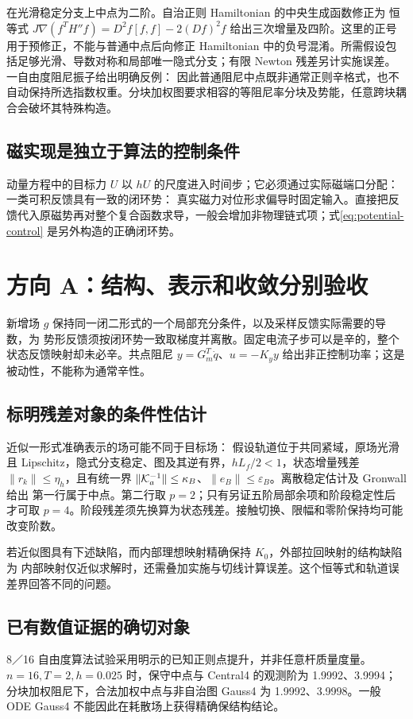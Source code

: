 在光滑稳定分支上中点为二阶。自治正则 Hamiltonian 的中央生成函数修正为
\EqCentral
恒等式 $J\nabla(f^TH''f)=D^2f[f,f]-2(Df)^2f$ 给出三次增量及四阶。这里的正号用于预修正，不能与普通中点后向修正 Hamiltonian 中的负号混淆。所需假设包括足够光滑、导数对称和局部唯一隐式分支；有限 Newton 残差另计实施误差。一自由度阻尼振子给出明确反例：
\EqDampingCounterexample
因此普通阻尼中点既非通常正则辛格式，也不自动保持所选指数权重。分块加权图要求相容的等阻尼率分块及势能，任意跨块耦合会破坏其特殊构造。

\subsection{磁实现是独立于算法的控制条件}
动量方程中的目标力 $U$ 以 $hU$ 的尺度进入时间步；它必须通过实际磁端口分配：
\EqAllocation
一类可积反馈具有一致的闭环势：
\EqPotentialControl
真实磁力对位形求偏导时固定输入。直接把反馈代入原磁势再对整个复合函数求导，一般会增加非物理链式项；式\eqref{eq:potential-control} 是另外构造的正确闭环势。

\PaperPage
\section{方向 A：结构、表示和收敛分别验收}
新增场 $g$ 保持同一闭二形式的一个局部充分条件，以及采样反馈实际需要的导数，为
\EqControlDerivative
势形反馈须按闭环势一致取梯度并离散。固定电流子步可以是辛的，整个状态反馈映射却未必辛。共点阻尼 $y=G_m^T\dot q$、$u=-K_yy$ 给出非正控制功率；这是被动性，不能称为通常辛性。

\subsection{标明残差对象的条件性估计}
近似一形式准确表示的场可能不同于目标场：
\EqRepresentationError
假设轨道位于共同紧域，原场光滑且 Lipschitz，隐式分支稳定、图及其逆有界，$hL_f/2<1$，状态增量残差 $\|r_k\|\le\eta_h$，且有统一界 $\|\mathcal K_a^{-1}\|\le\kappa_B$、$\|e_B\|\le\varepsilon_B$。离散稳定估计及 Gronwall 给出
\EqConvergence
第一行属于中点。第二行取 $p=2$；只有另证五阶局部余项和阶段稳定性后才可取 $p=4$。阶段残差须先换算为状态残差。接触切换、限幅和零阶保持均可能改变阶数。

若近似图具有下述缺陷，而内部理想映射精确保持 $K_0$，外部拉回映射的结构缺陷为
\EqChartError
内部映射仅近似求解时，还需叠加实施与切线计算误差。这个恒等式和轨道误差界回答不同的问题。

\subsection{已有数值证据的确切对象}
8／16 自由度算法试验采用明示的已知正则点提升，并非任意杆质量度量。$n=16,T=2,h=0.025$ 时，保守中点与 Central4 的观测阶为 1.9992、3.9994；分块加权阻尼下，合法加权中点与非自治图 Gauss4 为 1.9992、3.9998。一般 ODE Gauss4 不能因此在耗散场上获得精确保结构结论。


